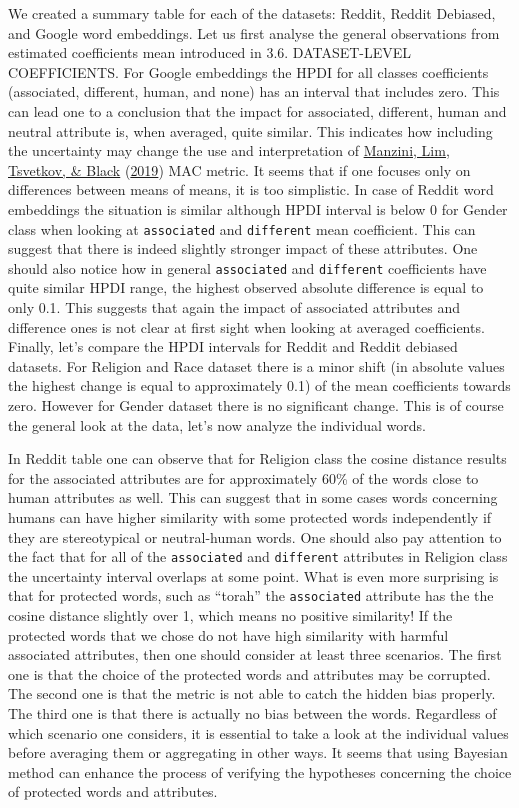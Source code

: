 \documentclass[
  12pt,
]{book}
\begin{document}
We created a summary table for each of the datasets: Reddit, Reddit Debiased, and Google word embeddings. Let us first analyse the general observations from estimated coefficients mean introduced in 3.6. DATASET-LEVEL COEFFICIENTS. For Google embeddings the HPDI for all classes coefficients (associated, different, human, and none) has an interval that includes zero. This can lead one to a conclusion that the impact for associated, different, human and neutral attribute is, when averaged, quite similar. This indicates how including the uncertainty may change the use and interpretation of \protect\hyperlink{ref-Manzini2019blackToCriminal}{Manzini, Lim, Tsvetkov, \& Black} (\protect\hyperlink{ref-Manzini2019blackToCriminal}{2019}) MAC metric. It seems that if one focuses only on differences between means of means, it is too simplistic. In case of Reddit word embeddings the situation is similar although HPDI interval is below 0 for Gender class when looking at \texttt{associated} and \texttt{different} mean coefficient. This can suggest that there is indeed slightly stronger impact of these attributes. One should also notice how in general \texttt{associated} and \texttt{different} coefficients have quite similar HPDI range, the highest observed absolute difference is equal to only 0.1. This suggests that again the impact of associated attributes and difference ones is not clear at first sight when looking at averaged coefficients. Finally, let's compare the HPDI intervals for Reddit and Reddit debiased datasets. For Religion and Race dataset there is a minor shift (in absolute values the highest change is equal to approximately 0.1) of the mean coefficients towards zero. However for Gender dataset there is no significant change. This is of course the general look at the data, let's now analyze the individual words.

In Reddit table one can observe that for Religion class the cosine distance results for the associated attributes are for approximately 60\% of the words close to human attributes as well. This can suggest that in some cases words concerning humans can have higher similarity with some protected words independently if they are stereotypical or neutral-human words. One should also pay attention to the fact that for all of the \texttt{associated} and \texttt{different} attributes in Religion class the uncertainty interval overlaps at some point. What is even more surprising is that for protected words, such as ``torah'' the \texttt{associated} attribute has the the cosine distance slightly over 1, which means no positive similarity! If the protected words that we chose do not have high similarity with harmful associated attributes, then one should consider at least three scenarios. The first one is that the choice of the protected words and attributes may be corrupted. The second one is that the metric is not able to catch the hidden bias properly. The third one is that there is actually no bias between the words. Regardless of which scenario one considers, it is essential to take a look at the individual values before averaging them or aggregating in other ways. It seems that using Bayesian method can enhance the process of verifying the hypotheses concerning the choice of protected words and attributes.
\end{document}
